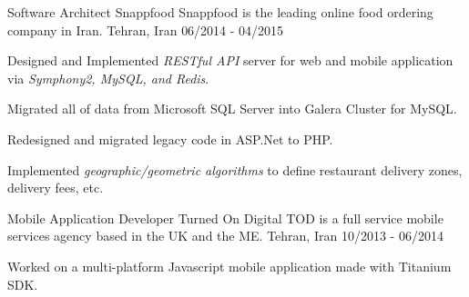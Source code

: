 \begin{cventries}
  \cventry
    {Software Architect} %
    {Snappfood} %
    {Snappfood is the leading online food ordering company in Iran.}
    {Tehran, Iran} %
    {06/2014 - 04/2015} %
    {
      \begin{cvitems} %
        \item {Designed and Implemented \emph{RESTful API} server for web and mobile application via \emph{Symphony2, MySQL, and Redis}.}
        \item {Migrated all of data from Microsoft SQL Server into Galera Cluster for MySQL.}
        \item {Redesigned and migrated legacy code in ASP.Net to PHP.}
        \item {Implemented \emph{geographic/geometric algorithms} to define restaurant delivery zones, delivery fees, etc.}
      \end{cvitems}
    }

  \cventry
    {Mobile Application Developer} %
    {Turned On Digital} %
    {TOD is a full service mobile services agency based in the UK and the ME.}
    {Tehran, Iran} %
    {10/2013 - 06/2014} %
    {
      \begin{cvitems} %
        \item {Worked on a multi-platform Javascript mobile application made with Titanium SDK.}
      \end{cvitems}
    }


\end{cventries}

